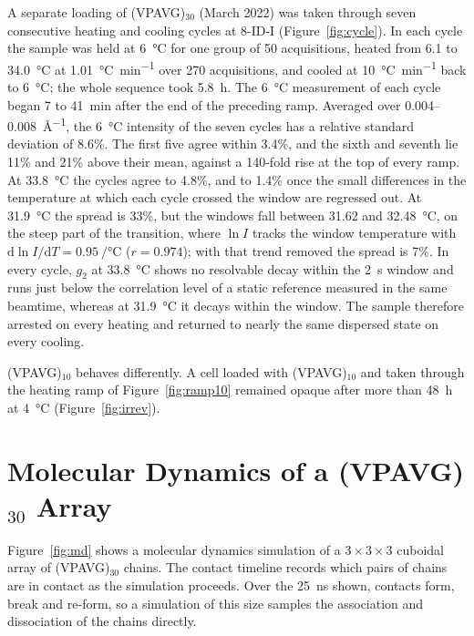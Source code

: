 \documentclass[11pt]{article}
\newcommand{\VP}[1]{(VPAVG)$_{#1}$}
\begin{document}
A separate loading of \VP{30} (March 2022) was taken through seven consecutive heating and cooling cycles at 8-ID-I (Figure~\ref{fig:cycle}). In each cycle the sample was held at \SI{6}{\degreeCelsius} for one group of 50 acquisitions, heated from 6.1 to \SI{34.0}{\degreeCelsius} at \SI{1.01}{\degreeCelsius\per\minute} over 270 acquisitions, and cooled at \SI{10}{\degreeCelsius\per\minute} back to \SI{6}{\degreeCelsius}; the whole sequence took \SI{5.8}{\hour}. The \SI{6}{\degreeCelsius} measurement of each cycle began 7 to \SI{41}{\minute} after the end of the preceding ramp. Averaged over 0.004--\SI{0.008}{\angstrom^{-1}}, the \SI{6}{\degreeCelsius} intensity of the seven cycles has a relative standard deviation of 8.6\%. The first five agree within 3.4\%, and the sixth and seventh lie 11\% and 21\% above their mean, against a 140-fold rise at the top of every ramp. At \SI{33.8}{\degreeCelsius} the cycles agree to 4.8\%, and to 1.4\% once the small differences in the temperature at which each cycle crossed the window are regressed out. At \SI{31.9}{\degreeCelsius} the spread is 33\%, but the windows fall between 31.62 and \SI{32.48}{\degreeCelsius}, on the steep part of the transition, where $\ln I$ tracks the window temperature with $\mathrm{d}\ln I/\mathrm{d}T=\SI{0.95}{\per\degreeCelsius}$ ($r=0.974$); with that trend removed the spread is 7\%. In every cycle, $g_2$ at \SI{33.8}{\degreeCelsius} shows no resolvable decay within the \SI{2}{\second} window and runs just below the correlation level of a static reference measured in the same beamtime, whereas at \SI{31.9}{\degreeCelsius} it decays within the window. The sample therefore arrested on every heating and returned to nearly the same dispersed state on every cooling.

\VP{10} behaves differently. A cell loaded with \VP{10} and taken through the heating ramp of Figure~\ref{fig:ramp10} remained opaque after more than \SI{48}{\hour} at \SI{4}{\degreeCelsius} (Figure~\ref{fig:irrev}).

\section{Molecular Dynamics of a \texorpdfstring{\VP{30}}{(VPAVG)30} Array}

Figure~\ref{fig:md} shows a molecular dynamics simulation of a $3\times3\times3$ cuboidal array of \VP{30} chains. The contact timeline records which pairs of chains are in contact as the simulation proceeds. Over the \SI{25}{\nano\second} shown, contacts form, break and re-form, so a simulation of this size samples the association and dissociation of the chains directly.
\end{document}
